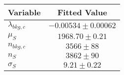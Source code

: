 \begin{tabular}[t]{lc}
\hline
Variable &Fitted Value\\
\hline\hline
$\lambda_{bkg,c}$&$-0.00534\pm0.00062$\\
\hline
$\mu_{S}$&$1968.70\pm0.21$\\
\hline
$n_{bkg,c}$&$3566\pm88$\\
\hline
$n_{S}$&$3862\pm90$\\
\hline
$\sigma_{S}$&$9.21\pm0.22$\\
\hline
\end{tabular}